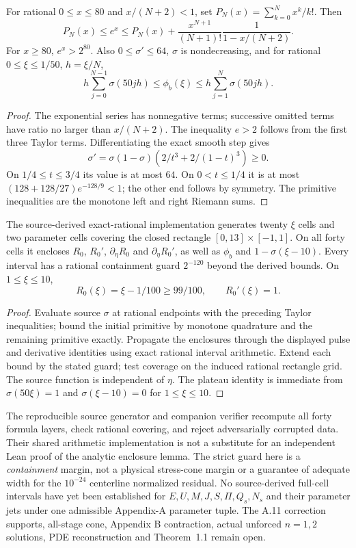 \begin{lemma}
For rational $0\le x\le80$ and $x/(N+2)<1$, set
$P_N(x)=\sum_{k=0}^N x^k/k!$. Then
\[
P_N(x)\le e^x\le
P_N(x)+\frac{x^{N+1}}{(N+1)!}\frac1{1-x/(N+2)}.
\]
For $x\ge80$, $e^x>2^{80}$. Also $0\le\sigma'\le64$,
$\sigma$ is nondecreasing, and for rational
$0\le\xi\le1/50$, $h=\xi/N$,
\[
h\sum_{j=0}^{N-1}\sigma(50jh)
\le\phi_b(\xi)\le
h\sum_{j=1}^{N}\sigma(50jh).
\]
\end{lemma}
\begin{proof}
The exponential series has nonnegative terms; successive omitted
terms have ratio no larger than $x/(N+2)$. The inequality $e>2$
follows from the first three Taylor terms. Differentiating the
exact smooth step gives
\[
\sigma'=\sigma(1-\sigma)\left(2/t^3+2/(1-t)^3\right)\ge0.
\]
On $1/4\le t\le3/4$ its value is at most $64$.
On $0<t\le1/4$ it is at most
$(128+128/27)e^{-128/9}<1$; the other end follows by
symmetry. The primitive inequalities are the monotone left and
right Riemann sums.
\end{proof}
\begin{proposition}
The source-derived exact-rational implementation generates twenty
$\xi$ cells and two parameter cells covering the closed rectangle
$[0,13]\times[-1,1]$. On all forty cells it encloses $R_0$, $R_0'$,
$\partial_\eta R_0$ and $\partial_\eta R_0'$, as well as $\phi_b$
and $1-\sigma(\xi-10)$. Every interval has a rational containment
guard $2^{-120}$ beyond the derived bounds. On $1\le\xi\le10$,
\[
R_0(\xi)=\xi-1/100\ge99/100,\qquad R_0'(\xi)=1.
\]
\end{proposition}
\begin{proof}
Evaluate source $\sigma$ at rational endpoints with the preceding
Taylor inequalities; bound the initial primitive by monotone
quadrature and the remaining primitive exactly. Propagate
the enclosures through the displayed pulse and derivative identities
using exact rational interval arithmetic. Extend each bound by the
stated guard; test coverage on the induced rational rectangle grid.
The source function is independent of $\eta$. The plateau identity
is immediate from $\sigma(50\xi)=1$ and
$\sigma(\xi-10)=0$ for $1\le\xi\le10$.
\end{proof}

The reproducible source generator and companion verifier recompute
all forty formula layers, check rational covering, and reject
adversarially corrupted data. Their shared arithmetic implementation
is not a substitute for an independent Lean proof of the analytic
enclosure lemma. The strict guard here is a \emph{containment}
margin, not a physical stress-cone margin or a guarantee of adequate
width for the $10^{-24}$ centerline normalized residual.
No source-derived full-cell intervals have yet been established for
$E,U,M,J,S,\Pi,Q_s,N_s$ and their parameter jets under one admissible
Appendix-A parameter tuple. The A.11 correction supports, all-stage
cone, Appendix B contraction, actual unforced $n=1,2$ solutions,
PDE reconstruction and Theorem~1.1 remain open.
